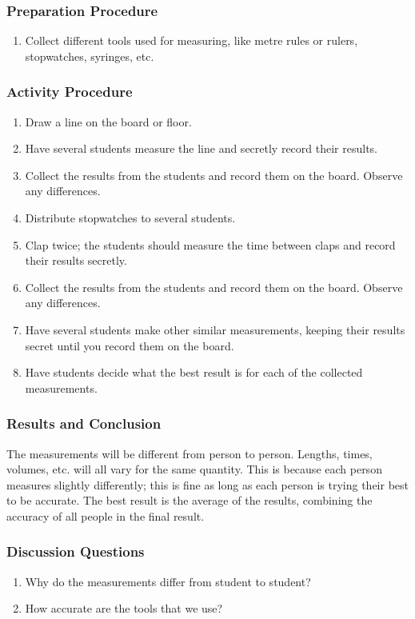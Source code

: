 \subsubsection*{Preparation Procedure}
\begin{enumerate}
\item{Collect different tools used for measuring, like metre rules or rulers, stopwatches, syringes, etc.}
\end{enumerate}

\subsubsection*{Activity Procedure}
\begin{enumerate}
\item{Draw a line on the board or floor.}
\item{Have several students measure the line and secretly record their results.}
\item{Collect the results from the students and record them on the board. Observe any differences.}
\item{Distribute stopwatches to several students.}
\item{Clap twice; the students should measure the time between claps and record their results secretly.}
\item{Collect the results from the students and record them on the board. Observe any differences.}
\item{Have several students make other similar measurements, keeping their results secret until you record them on the board.}
\item{Have students decide what the best result is for each of the collected measurements.}
\end{enumerate}

\subsubsection*{Results and Conclusion}
The measurements will be different from person to person. Lengths, times, volumes, etc. will all vary for the same quantity. This is because each person measures slightly differently; this is fine as long as each person is trying their best to be accurate. The best result is the average of the results, combining the accuracy of all people in the final result.

\subsubsection*{Discussion Questions}
\begin{enumerate}
\item{Why do the measurements differ from student to student?}
\item{How accurate are the tools that we use?}
\end{enumerate}


